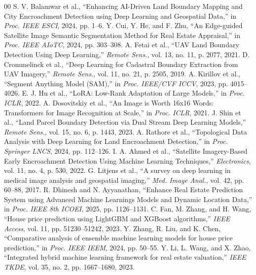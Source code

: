 \documentclass[conference]{IEEEtran}
\begin{document}
\begin{thebibliography}{00}
 S. V. Balamwar et al., ``Enhancing AI-Driven Land Boundary Mapping and City Encroachment Detection using Deep Learning and Geospatial Data,'' in \textit{Proc. IEEE ESCI}, 2024, pp. 1--6.
 Y. Cui, Y. He, and F. Zhu, ``An Edge-guided Satellite Image Semantic Segmentation Method for Real Estate Appraisal,'' in \textit{Proc. IEEE AIoTC}, 2024, pp. 303--308.
 A. Fetai et al., ``UAV Land Boundary Detection Using Deep Learning,'' \textit{Remote Sens.}, vol. 13, no. 11, p. 2077, 2021.
 D. Crommelinck et al., ``Deep Learning for Cadastral Boundary Extraction from UAV Imagery,'' \textit{Remote Sens.}, vol. 11, no. 21, p. 2505, 2019.
 A. Kirillov et al., ``Segment Anything Model (SAM),'' in \textit{Proc. IEEE/CVF ICCV}, 2023, pp. 4015--4026.
 E. J. Hu et al., ``LoRA: Low-Rank Adaptation of Large Models,'' in \textit{Proc. ICLR}, 2022.
 A. Dosovitskiy et al., ``An Image is Worth 16x16 Words: Transformers for Image Recognition at Scale,'' in \textit{Proc. ICLR}, 2021.
 J. Shin et al., ``Land Parcel Boundary Detection via Dual Stream Deep Learning Models,'' \textit{Remote Sens.}, vol. 15, no. 6, p. 1443, 2023.
 A. Rathore et al., ``Topological Data Analysis with Deep Learning for Land Encroachment Detection,'' in \textit{Proc. Springer LNCS}, 2024, pp. 112--126.
 I. A. Ahmed et al., ``Satellite Imagery-Based Early Encroachment Detection Using Machine Learning Techniques,'' \textit{Electronics}, vol. 11, no. 4, p. 530, 2022.
 G. Litjens et al., ``A survey on deep learning in medical image analysis and geospatial imaging,'' \textit{Med. Image Anal.}, vol. 42, pp. 60--88, 2017.
 R. Dhinesh and N. Ayyanathan, ``Enhance Real Estate Prediction System using Advanced Machine Learnings Models and Dynamic Location Data,'' in \textit{Proc. IEEE 8th ICOEI}, 2025, pp. 1126--1131.
 C. Fan, M. Zhang, and H. Wang, ``House price prediction using LightGBM and XGBoost algorithms,'' \textit{IEEE Access}, vol. 11, pp. 51230--51242, 2023.
 Y. Zhang, R. Liu, and K. Chen, ``Comparative analysis of ensemble machine learning models for house price prediction,'' in \textit{Proc. IEEE IEEM}, 2024, pp. 50--55.
 Y. Li, L. Wang, and X. Zhao, ``Integrated hybrid machine learning framework for real estate valuation,'' \textit{IEEE TKDE}, vol. 35, no. 2, pp. 1667--1680, 2023.

\end{thebibliography}
\end{document}
